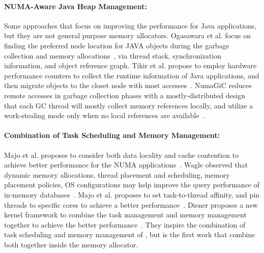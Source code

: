 \paragraph{NUMA-Aware Java Heap Management:} Some approaches that focus on improving the performance for Java applications, but they are not general purpose memory allocators. Ogasawara et al. focus on finding the preferred node location for JAVA objects during the garbage collection and memory allocations~\cite{Ogasawara:2009:NMM:1640089.1640117}, via thread stack, synchronization information, and object reference graph. Tikir et al. propose to employ hardware performance counters to collect the runtime information of Java applications, and then migrate objects to the closet node with most accesses~\cite{1419934}. 
NumaGiC reduces remote accesses in garbage collection phases with a mostly-distributed design that each GC thread will mostly collect memory references locally, and utilize a work-stealing mode only when no local references are available~\cite{NumaGiC}.


\paragraph{Combination of Task Scheduling and Memory Management:} 
Majo et al. proposes to consider both data locality and cache contention to achieve better performance for the NUMA applications~\cite{Majo:2011:MMN:1993478.1993481}. Wagle observed that dynamic memory allocations, thread placement and scheduling, memory placement policies, OS configurations may help improve the query performance of in-memory databases~\cite{wagle2015numa}.  Majo et al. proposes to set task-to-thread affinity, and pin threads to specific cores to achieve a better performance~\cite{Majo:2015:LPC:2688500.2688509}. Diener proposes a new kernel framework to combine the task management and memory management together to achieve the better performance~\cite{diener2015automatic}.
They inspire the combination of task scheduling and memory management of \NM{}, but \NM{} is the first work that combine both together inside the memory allocator. 



